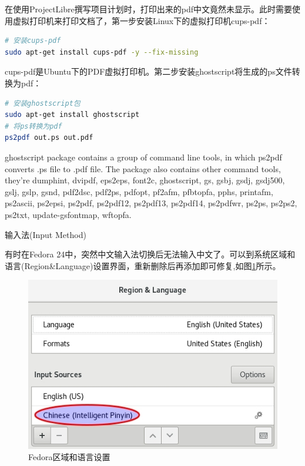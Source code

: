 \documentclass[12pt]{book}
\makeatletter
\numberwithin{dummy}{section}
\theoremstyle{ocrenumbox}
\theoremstyle{blacknumex}
\theoremstyle{blacknumbox}
\theoremstyle{ocrenum}
\renewcommand{\subsection}{\@startsection {subsection}{2}{\z@}
	{-3ex \@plus -0.1ex \@minus -.4ex}
	{0.5ex \@plus.2ex }
	{\normalfont\sffamily\bfseries}}
\makeatother
\begin{document}
在使用ProjectLibre撰写项目计划时，打印出来的pdf中文竟然未显示。此时需要使用虚拟打印机来打印文档了，第一步安装Linux下的虚拟打印机cups-pdf：

\begin{lstlisting}[language=Bash]
# 安装cups-pdf
sudo apt-get install cups-pdf -y --fix-missing
\end{lstlisting}

cups-pdf是Ubuntu下的PDF虚拟打印机。第二步安装ghostscript将生成的ps文件转换为pdf：

\begin{lstlisting}[language=Bash]
# 安装ghostscript包
sudo apt-get install ghostscript
# 将ps转换为pdf
ps2pdf out.ps out.pdf
\end{lstlisting}

ghostscript package contains a group of command line tools, in which ps2pdf converts .ps file to .pdf file. The package also contains other command tools, they’re dumphint, dvipdf, eps2eps, font2c, ghostscript, gs, gsbj, gsdj, gsdj500, gslj, gslp, gsnd, pdf2dsc, pdf2ps, pdfopt, pf2afm, pfbtopfa, pphs, printafm, ps2ascii, ps2epsi, ps2pdf, ps2pdf12, ps2pdf13, ps2pdf14, ps2pdfwr, ps2ps, ps2ps2, ps2txt, update-gsfontmap, wftopfa.

\subsection{输入法(Input Method)}

有时在Fedora 24中，突然中文输入法切换后无法输入中文了。可以到系统区域和语言(Region\&Language)设置界面，重新删除后再添加即可修复,如图\ref{fig:regionandlanguagesetting}所示。

\begin{figure}[htbp]
	\centering
	\includegraphics[scale=0.6]{regionandlanguagesetting.jpg}
	\caption{Fedora区域和语言设置}
	\label{fig:regionandlanguagesetting}
\end{figure}
\end{document}

